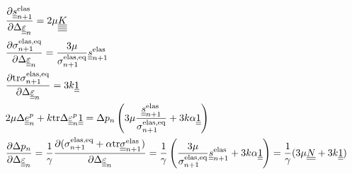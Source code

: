 \documentclass[12pt]{article}
\begin{document}
\begin{appendices}
    \begin{align}
        & \frac{\partial \uusnelas{}}{\partial \Deltaeps} = 2\mu \uuuuK\\
        & \frac{\partial \sigmaeqnelas{}}{\partial \Deltaeps} = \frac{3\mu}{\sigmaeqnelas}\uusnelas \\
        & \frac{\partial\mtr\sigmaeqnelas}{\partial\Deltaeps} = 3k\uuUnit \\
        & 2\mu\Deltaep + k\mtr\Deltaepsp\uuUnit = \Delta p_n\left( 3\mu \frac{\uusnelas}{\sigmaeqnelas} + 3k\alpha \uuUnit  \right) \\
        & \frac{\partial\Delta p_n}{\partial\Deltaeps} = \frac{1}{\gamma} \frac{\partial(\sigmaeqnelas + \alpha \mtr \uusigmanelas)}{\partial\Deltaeps} = \frac{1}{\gamma} \left( \frac{3\mu}{\sigmaeqnelas}\uusnelas + 3k\alpha\uuUnit \right) = \frac{1}{\gamma}(3\mu \uuN + 3k\uuUnit)
    \end{align}


\end{appendices}
\end{document}
